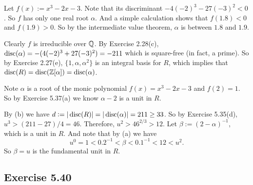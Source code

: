 \documentclass[../Marcus.tex]{subfiles}
\begin{document}
Let $f(x):=x^3-2x-3$. Note that its discriminant $-4(-2)^3-27(-3)^2 < 0$. So $f$ has only one real root $\alpha$. And a simple calculation shows that $f(1.8) < 0 $ and $f(1.9) > 0$. So by the intermediate value theorem, $\alpha$ is between $1.8$ and $1.9$.

Clearly $f$ is irreducible over $\mathbb{Q}$. By Exercise 2.28(c), $\operatorname{disc}(\alpha) = -(4(-2)^3+27(-3)^2) = -211$ which is square-free (in fact, a prime). So by Exercise 2.27(e), $\{1,\alpha,\alpha^2\}$ is an integral basis for $R$, which implies that $\operatorname{disc}(R) = \operatorname{disc}(\mathbb{Z}[\alpha]) = \operatorname{disc}(\alpha)$.

Note $\alpha$ is a root of the monic polynomial $f(x)=x^3-2x-3$ and $f(2)=1$. So by Exercise 5.37(a) we know $\alpha-2$ is a unit in $R$.

By (b) we have $d := |\operatorname{disc}(R)| = |\operatorname{disc}(\alpha)| = 211 \geq 33$. So by Exercise 5.35(d), $u^3 > (211-27)/4 = 46$. Therefore, $u^2 > 46^{2/3} > 12$. Let $\beta:=(2-\alpha)^{-1}$, which is a unit in $R$. And note that by (a) we have
$$
u^0 = 1 < 0.2^{-1} < \beta < 0.1^{-1} < 12 < u^2.
$$
So $\beta=u$ is the fundamental unit in $R$.

\subsection*{Exercise 5.40}

\begin{comment}
(a) Let $f(x):=x^3+ax-1$. The only possible rational roots of $f$ are $\pm1$, which clearly do not satisfy $f$. So $f$ is irreducible over $\QQ$. Note that its discriminant $-4a^3-27(-1)^2 = -4a^3-27 < 0$ for all $a\in\NN$. So $f$ has only one real root $\alpha$.

(b) By Exercise 2.28(c), $\disc(\alpha) = -(4a^3+27)$.

(c) Suppose $\disc(\alpha) = -(4a^3+27)$ is square-free. Then by Exercise 2.27(e), $\{1,\alpha,\alpha^2\}$ is an integral basis for $R$, which implies that $\disc(R) = \disc(\ZZ[\alpha]) = \disc(\alpha)$. Now, by (b) we have $d := |\disc(R)| = |\disc(\alpha)| = 4a^3+27 \geq 33$ for all $a \geq 2$. (Since $u>1$ so we can only consider $a\geq2$.) So by Exercise 5.35(d), $u^3 > (d-27)/4 = a^3$. Therefore, $u>a$. 

On the other hand, note $\alpha$ is a root of the monic polynomial $f(x)=x^3+ax-1$ and $f(0)=-1$. So by Exercise 5.37(a) we know $\alpha$ is a unit in $R$. Moreover, we see that $f(0)<0$ and $f(1)=a>0$. So by the intermediate value theorem, $\alpha$ is between $0$ and $1$.

Since $\alpha^{-1}>1$ is a unit, so $\alpha^{-1} = u^k > a$ for some $k\in\NN$. Moreover, the two facts $\alpha > \alpha^3$ and $\alpha^3+a\alpha-1=0$ give us $\alpha^{-1} < a+1$. So we have $\alpha^{-1}$ is between $a$ and $a+1$.

Suppose now $a\geq2$, then we have
$$
u^0 = 1 < a < \alpha^{-1} = u^k < a+1 < u+1 < u^2
$$
(As $u>a\geq2$, it's easy to check that $u+1<u^2$.) So $\alpha^{-1}=u$ is the fundamental unit in $R$.
\end{comment}
\end{document}
